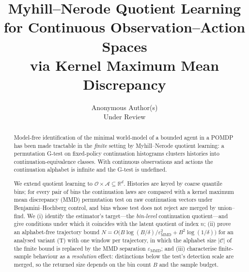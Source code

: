 \documentclass[10pt]{article}
\newcommand{\calO}{\mathcal{O}}
\newcommand{\calA}{\mathcal{A}}
\newcommand{\calC}{\mathcal{C}}
\newcommand{\bbR}{\mathbb{R}}
\newcommand{\epsMMD}{\varepsilon_{\mathrm{MMD}}}
\begin{document}
\title{Myhill--Nerode Quotient Learning\\
       for Continuous Observation--Action Spaces\\
       via Kernel Maximum Mean Discrepancy}

\author{%
  Anonymous Author(s)\\
  Under Review
}

\maketitle

\begin{abstract}
Model-free identification of the minimal world-model of a bounded agent in a
POMDP has been made tractable in the \emph{finite} setting by Myhill--Nerode
quotient learning: a permutation G-test on fixed-policy continuation histograms
clusters histories into continuation-equivalence classes. With continuous
observations and actions the continuation alphabet is infinite and the G-test
is undefined.

We extend quotient learning to $\calO\times\calA\subseteq\bbR^d$. Histories are
keyed by coarse quantile bins; for every pair of bins the continuation laws are
compared with a kernel maximum mean discrepancy (MMD) permutation test on raw
continuation vectors under Benjamini--Hochberg control, and bins whose test does
not reject are merged by union--find. We (i) identify the estimator's target---the
\emph{bin-level} continuation quotient---and give conditions under which it
coincides with the latent quotient of index $n$; (ii) prove an alphabet-free
trajectory bound $N=O\!\big(B\log(B/\delta)/\epsMMD^2+B^2\log(1/\delta)\big)$
for an analysed variant (T) with one window per trajectory, in which the alphabet size $|\calC|$ of the finite bound is replaced by the MMD
separation $\epsMMD$; and (iii) characterise finite-sample behaviour as a
\emph{resolution} effect: distinctions below the test's detection scale are
merged, so the returned size depends on the bin count $B$ and the sample budget.


\end{abstract}
\end{document}
